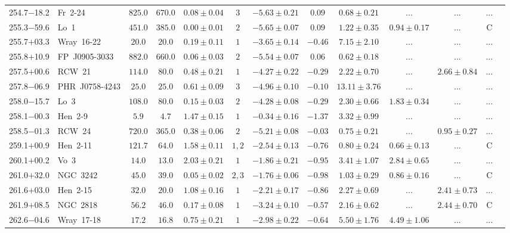 \documentclass[useAMS]{mn2e}
\begin{document}
\begin{center}
{\begin{longtable}{llccccccccccc}
254.7$-$18.2&Fr~2-24&$     825.0$&$     670.0$&$0.08 \pm 0.04$&$3$&$-5.63 \pm 0.21$&$      0.09$&$0.68 \pm 0.21$&$...$&$...$&...\\
255.3$-$59.6&Lo~1&$     451.0$&$     385.0$&$0.00 \pm 0.01$&$2$&$-5.65 \pm 0.07$&$      0.09$&$1.22 \pm 0.35$&$0.94 \pm 0.17$&$...$&C\\
255.7$+$03.3&Wray~16-22&$      20.0$&$      20.0$&$0.19 \pm 0.11$&$1$&$-3.65 \pm 0.14$&$     -0.46$&$7.15 \pm 2.10$&$...$&$...$&...\\
255.8$+$10.9&FP~J0905-3033&$     882.0$&$     660.0$&$0.06 \pm 0.03$&$2$&$-5.54 \pm 0.07$&$      0.06$&$0.62 \pm 0.18$&$...$&$...$&...\\
257.5$+$00.6&RCW~21&$     114.0$&$      80.0$&$0.48 \pm 0.21$&$1$&$-4.27 \pm 0.22$&$     -0.29$&$2.22 \pm 0.70$&$...$&$2.66 \pm 0.84$&...\\
257.8$-$06.9&PHR~J0758-4243&$      25.0$&$      25.0$&$0.61 \pm 0.09$&$3$&$-4.96 \pm 0.10$&$     -0.10$&$13.11 \pm 3.76$&$...$&$...$&...\\
258.0$-$15.7&Lo~3&$     108.0$&$      80.0$&$0.15 \pm 0.03$&$2$&$-4.28 \pm 0.08$&$     -0.29$&$2.30 \pm 0.66$&$1.83 \pm 0.34$&$...$&...\\
258.1$-$00.3&Hen~2-9&$       5.9$&$       4.7$&$1.47 \pm 0.15$&$1$&$-0.34 \pm 0.16$&$     -1.37$&$3.32 \pm 0.99$&$...$&$...$&...\\
258.5$-$01.3&RCW~24&$     720.0$&$     365.0$&$0.38 \pm 0.06$&$2$&$-5.21 \pm 0.08$&$     -0.03$&$0.75 \pm 0.21$&$...$&$0.95 \pm 0.27$&...\\
259.1$+$00.9&Hen~2-11&$     121.7$&$      64.0$&$1.58 \pm 0.11$&$1,2$&$-2.54 \pm 0.13$&$     -0.76$&$0.80 \pm 0.24$&$0.66 \pm 0.13$&$...$&C\\
260.1$+$00.2&Vo~3&$      14.0$&$      13.0$&$2.03 \pm 0.21$&$1$&$-1.86 \pm 0.21$&$     -0.95$&$3.41 \pm 1.07$&$2.84 \pm 0.65$&$...$&...\\
261.0$+$32.0&NGC~3242&$      45.0$&$      39.0$&$0.05 \pm 0.02$&$2,3$&$-1.76 \pm 0.06$&$     -0.98$&$1.03 \pm 0.29$&$0.86 \pm 0.16$&$...$&C\\
261.6$+$03.0&Hen~2-15&$      32.0$&$      20.0$&$1.08 \pm 0.16$&$1$&$-2.21 \pm 0.17$&$     -0.86$&$2.27 \pm 0.69$&$...$&$2.41 \pm 0.73$&...\\
261.9$+$08.5&NGC~2818&$      56.2$&$      46.0$&$0.17 \pm 0.08$&$1$&$-3.24 \pm 0.10$&$     -0.57$&$2.16 \pm 0.62$&$...$&$2.44 \pm 0.70$&C\\
262.6$-$04.6&Wray~17-18&$      17.2$&$      16.8$&$0.75 \pm 0.21$&$1$&$-2.98 \pm 0.22$&$     -0.64$&$5.50 \pm 1.76$&$4.49 \pm 1.06$&$...$&...\\

\end{longtable}}
\end{center}
\end{document}
